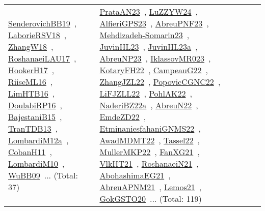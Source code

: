 {\begin{longtable}{lp{3cm}>{\raggedright\arraybackslash}p{6cm}>{\raggedright\arraybackslash}p{6cm}>{\raggedright\arraybackslash}p{8cm}}
\href{../works/SenderovichBB19.pdf}{SenderovichBB19}~\cite{SenderovichBB19}, \href{../works/LaborieRSV18.pdf}{LaborieRSV18}~\cite{LaborieRSV18}, \href{../works/ZhangW18.pdf}{ZhangW18}~\cite{ZhangW18}, \href{../works/RoshanaeiLAU17.pdf}{RoshanaeiLAU17}~\cite{RoshanaeiLAU17}, \href{../works/HookerH17.pdf}{HookerH17}~\cite{HookerH17}, \href{../works/RiiseML16.pdf}{RiiseML16}~\cite{RiiseML16}, \href{../works/LimHTB16.pdf}{LimHTB16}~\cite{LimHTB16}, \href{../works/DoulabiRP16.pdf}{DoulabiRP16}~\cite{DoulabiRP16}, \href{../works/BajestaniB15.pdf}{BajestaniB15}~\cite{BajestaniB15}, \href{../works/TranTDB13.pdf}{TranTDB13}~\cite{TranTDB13}, \href{../works/LombardiM12a.pdf}{LombardiM12a}~\cite{LombardiM12a}, \href{../works/CobanH11.pdf}{CobanH11}~\cite{CobanH11}, \href{../works/LombardiM10.pdf}{LombardiM10}~\cite{LombardiM10}, \href{../works/WuBB09.pdf}{WuBB09}~\cite{WuBB09}... (Total: 37) & \href{../works/PrataAN23.pdf}{PrataAN23}~\cite{PrataAN23}, \href{../works/LuZZYW24.pdf}{LuZZYW24}~\cite{LuZZYW24}, \href{../works/AlfieriGPS23.pdf}{AlfieriGPS23}~\cite{AlfieriGPS23}, \href{../works/AbreuPNF23.pdf}{AbreuPNF23}~\cite{AbreuPNF23}, \href{../works/Mehdizadeh-Somarin23.pdf}{Mehdizadeh-Somarin23}~\cite{Mehdizadeh-Somarin23}, \href{../works/JuvinHL23.pdf}{JuvinHL23}~\cite{JuvinHL23}, \href{../works/JuvinHL23a.pdf}{JuvinHL23a}~\cite{JuvinHL23a}, \href{../works/AbreuNP23.pdf}{AbreuNP23}~\cite{AbreuNP23}, \href{../works/IklassovMR023.pdf}{IklassovMR023}~\cite{IklassovMR023}, \href{../works/KotaryFH22.pdf}{KotaryFH22}~\cite{KotaryFH22}, \href{../works/CampeauG22.pdf}{CampeauG22}~\cite{CampeauG22}, \href{../works/ZhangJZL22.pdf}{ZhangJZL22}~\cite{ZhangJZL22}, \href{../works/PopovicCGNC22.pdf}{PopovicCGNC22}~\cite{PopovicCGNC22}, \href{../works/LiFJZLL22.pdf}{LiFJZLL22}~\cite{LiFJZLL22}, \href{../works/PohlAK22.pdf}{PohlAK22}~\cite{PohlAK22}, \href{../works/NaderiBZ22a.pdf}{NaderiBZ22a}~\cite{NaderiBZ22a}, \href{../works/AbreuN22.pdf}{AbreuN22}~\cite{AbreuN22}, \href{../works/EmdeZD22.pdf}{EmdeZD22}~\cite{EmdeZD22}, \href{../works/EtminaniesfahaniGNMS22.pdf}{EtminaniesfahaniGNMS22}~\cite{EtminaniesfahaniGNMS22}, \href{../works/AwadMDMT22.pdf}{AwadMDMT22}~\cite{AwadMDMT22}, \href{../works/Tassel22.pdf}{Tassel22}~\cite{Tassel22}, \href{../works/MullerMKP22.pdf}{MullerMKP22}~\cite{MullerMKP22}, \href{../works/FanXG21.pdf}{FanXG21}~\cite{FanXG21}, \href{../works/VlkHT21.pdf}{VlkHT21}~\cite{VlkHT21}, \href{../works/RoshanaeiN21.pdf}{RoshanaeiN21}~\cite{RoshanaeiN21}, \href{../works/AbohashimaEG21.pdf}{AbohashimaEG21}~\cite{AbohashimaEG21}, \href{../works/AbreuAPNM21.pdf}{AbreuAPNM21}~\cite{AbreuAPNM21}, \href{../works/Lemos21.pdf}{Lemos21}~\cite{Lemos21}, \href{../works/GokGSTO20.pdf}{GokGSTO20}~\cite{GokGSTO20}... (Total: 119)\\

\end{longtable}}
